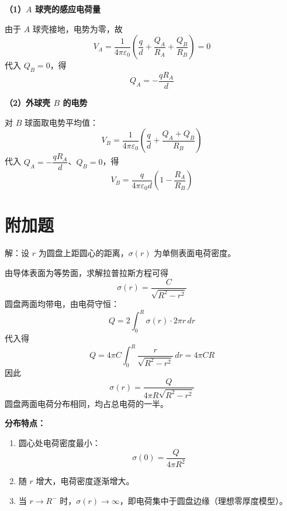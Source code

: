 \documentclass[UTF8,a4paper,12pt]{ctexart}
\begin{document}
\textbf{（1）$A$ 球壳的感应电荷量}

由于 $A$ 球壳接地，电势为零，故
\[
V_A
=
\frac{1}{4\pi\varepsilon_0}
\left(
\frac{q}{d}+\frac{Q_A}{R_A}+\frac{Q_B}{R_B}
\right)
=0
\]
代入 $Q_B=0$，得
\[
\boxed{Q_A=-\frac{qR_A}{d}}
\]

\textbf{（2）外球壳 $B$ 的电势}

对 $B$ 球面取电势平均值：
\[
V_B
=
\frac{1}{4\pi\varepsilon_0}
\left(
\frac{q}{d}+\frac{Q_A+Q_B}{R_B}
\right)
\]
代入 $Q_A=-\dfrac{qR_A}{d}$、$Q_B=0$，得
\[
\boxed{
V_B
=
\frac{q}{4\pi\varepsilon_0d}
\left(
1-\frac{R_A}{R_B}
\right)
}
\]

\section*{附加题}

解：设 $r$ 为圆盘上距圆心的距离，$\sigma(r)$ 为单侧表面电荷密度。

由导体表面为等势面，求解拉普拉斯方程可得
\[
\sigma(r)=\frac{C}{\sqrt{R^2-r^2}}
\]
圆盘两面均带电，由电荷守恒：
\[
Q=2\int_0^R\sigma(r)\cdot2\pi r\,dr
\]
代入得
\[
Q
=
4\pi C\int_0^R\frac{r}{\sqrt{R^2-r^2}}\,dr
=
4\pi CR
\]
因此
\[
\boxed{\sigma(r)=\frac{Q}{4\pi R\sqrt{R^2-r^2}}}
\]
圆盘两面电荷分布相同，均占总电荷的一半。

\textbf{分布特点：}

\begin{enumerate}
\item 圆心处电荷密度最小：
\[
\sigma(0)=\frac{Q}{4\pi R^2}
\]
\item 随 $r$ 增大，电荷密度逐渐增大。
\item 当 $r\to R^-$ 时，$\sigma(r)\to\infty$，即电荷集中于圆盘边缘（理想零厚度模型）。
\end{enumerate}
\end{document}
